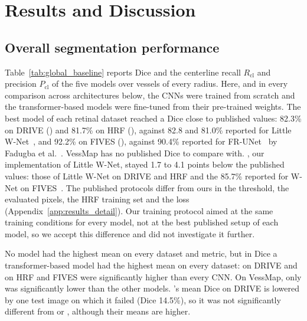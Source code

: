 \section{Results and Discussion}
\label{sec:results_discussion}

\newcommand{\fillertext}{Lorem ipsum dolor sit amet, consectetur adipiscing elit, sed do eiusmod tempor incididunt ut labore et dolore magna aliqua. Ut enim ad minim veniam, quis nostrud exercitation ullamco laboris nisi ut aliquip ex ea commodo consequat. Duis aute irure dolor in reprehenderit in voluptate velit esse cillum dolore eu fugiat nulla pariatur. Excepteur sint occaecat cupidatat non proident, sunt in culpa qui officia deserunt mollit anim id est laborum.}
\newcommand{\placeholderpar}[1]{{\color{gray}\textit{[Placeholder: #1]} \fillertext\par}}

\subsection{Overall segmentation performance}
\label{subsec:results_overall}

Table~\ref{tab:global_baseline} reports Dice and the centerline recall $R_{\mathrm{cl}}$ and precision $P_{\mathrm{cl}}$ of the five models over vessels of every radius. Here, and in every comparison across architectures below, the CNNs were trained from scratch and the transformer-based models were fine-tuned from their pre-trained weights. The best model of each retinal dataset reached a Dice close to published values: 82.3\% on DRIVE (\litemedsam{}) and 81.7\% on HRF (\medsam{}), against 82.8 and 81.0\% reported for Little W-Net~\cite{galdran2020littlewnetcouldstateoftheart}, and 92.2\% on FIVES (\medsam{}), against 90.4\% reported for FR-UNet~\cite{liu2022frunet} by Fadugba et al.~\cite{fadugba2024benchmarking}. VessMap has no published Dice to compare with. \lwnet{}, our implementation of Little W-Net, stayed 1.7 to 4.1 points below the published values: those of Little W-Net on DRIVE and HRF and the 85.7\% reported for W-Net on FIVES~\cite{fadugba2024benchmarking}. The published protocols differ from ours in the threshold, the evaluated pixels, the HRF training set and the loss (Appendix~\ref{app:results_detail}). Our training protocol aimed at the same training conditions for every model, not at the best published setup of each model, so we accept this difference and did not investigate it further.

No model had the highest mean on every dataset and metric, but in Dice a transformer-based model had the highest mean on every dataset: \litemedsam{} on DRIVE and \medsam{} on HRF and FIVES were significantly higher than every CNN. On VessMap, only \convnext{} was significantly lower than the other models. \convunext{}'s mean Dice on DRIVE is lowered by one test image on which it failed (Dice 14.5\%), so it was not significantly different from \lwnet{} or \medsam{}, although their means are higher.

